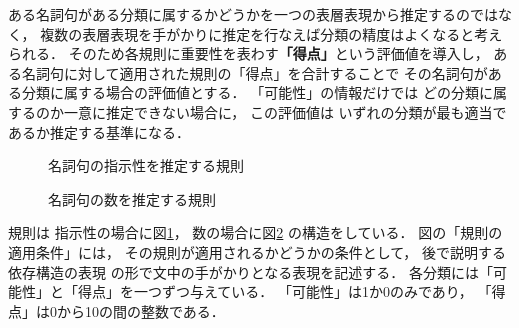 ある名詞句がある分類に属するかどうかを一つの表層表現から推定するのではなく，
複数の表層表現を手がかりに推定を行なえば分類の精度はよくなると考えられる．
そのため各規則に重要性を表わす{\bf 「得点」}という評価値を導入し，
ある名詞句に対して適用された規則の「得点」を合計することで
その名詞句がある分類に属する場合の評価値とする．
「可能性」の情報だけでは
どの分類に属するのか一意に推定できない場合に，
この評価値は
いずれの分類が最も適当であるか推定する基準になる．

\begin{figure}[t]
\small
  \begin{center}
  \caption{名詞句の指示性を推定する規則}
  \label{fig:rule_kouzou_sijisei}
  \end{center}
\end{figure}


\begin{figure}[t]
\small
  \begin{center}
  \caption{名詞句の数を推定する規則}
  \label{fig:rule_kouzou_suu}
  \end{center}
\end{figure}

規則は
指示性の場合に図\ref{fig:rule_kouzou_sijisei}，
数の場合に図\ref{fig:rule_kouzou_suu}
の構造をしている．
図の「規則の適用条件」には，
その規則が適用されるかどうかの条件として，
後で説明する
依存構造の表現
の形で文中の手がかりとなる表現を記述する．
各分類には「可能性」と「得点」を一つずつ与えている．
「可能性」は1か0のみであり，
「得点」は0から10の間の整数である．


